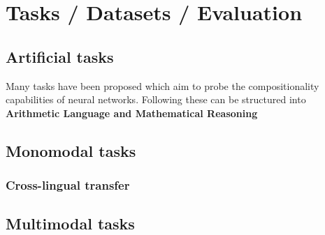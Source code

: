 

\section{Tasks / Datasets / Evaluation}


\subsection{Artificial tasks}

Many tasks have been proposed which aim to probe the compositionality capabilities of neural networks. Following \citet{Hupkes2020Compositionality} these can be structured into \textbf{Arithmetic Language and Mathematical Reasoning} \cite{Veldhoen2016DiagnosticClassifiers, Hupkes2018Visualisation, Saxton2019AnalysingMath}


\subsection{Monomodal tasks}

\subsubsection{Cross-lingual transfer}


\subsection{Multimodal tasks}
\cite{Johnson2017CLEVR}
